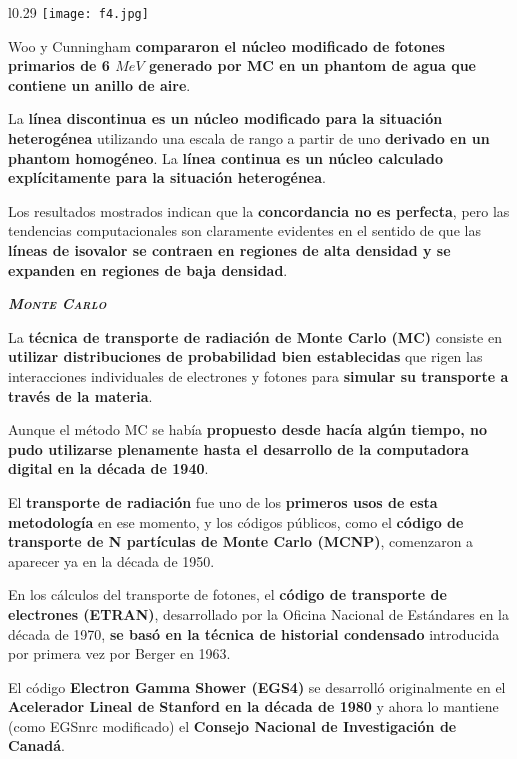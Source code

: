 \documentclass[aspectratio=169,xcolor=dvipsnames,t]{beamer}
\begin{document}
\begin{frame}

    \begin{wrapfigure}{l}{0.29\textwidth}
        \centering
        \texttt{[image: f4.jpg]}
    \end{wrapfigure}

    Woo y Cunningham \textbf{compararon el núcleo modificado de fotones primarios de 6 $MeV$ generado por MC en un phantom de agua que contiene un anillo de aire}. 
    
    La \textbf{línea discontinua es un núcleo modificado para la situación heterogénea} utilizando una escala de rango a partir de uno \textbf{derivado en un phantom homogéneo}. La \textbf{línea continua es un núcleo calculado explícitamente para la situación heterogénea}.

    Los resultados mostrados indican que la \textbf{concordancia no es perfecta}, pero las tendencias computacionales son claramente evidentes en el sentido de que las \textbf{líneas de isovalor se contraen en regiones de alta densidad y se expanden en regiones de baja densidad}.

\end{frame}



\begin{frame}[standout]
    \centering\LARGE
    \textbf{\itshape\scshape Monte Carlo}
\end{frame}

\begin{frame}

    La \textbf{técnica de transporte de radiación de Monte Carlo (MC)} consiste en \textbf{utilizar distribuciones de probabilidad bien establecidas} que rigen las interacciones individuales de electrones y fotones para \textbf{simular su transporte a través de la materia}.

    Aunque el método MC se había \textbf{propuesto desde hacía algún tiempo, no pudo utilizarse plenamente hasta el desarrollo de la computadora digital en la década de 1940}.

    El \textbf{transporte de radiación} fue uno de los \textbf{primeros usos de esta metodología} en ese momento, y los códigos públicos, como el \textbf{código de transporte de N partículas de Monte Carlo (MCNP)}, comenzaron a aparecer ya en la década de 1950.

    En los cálculos del transporte de fotones, el \textbf{código de transporte de electrones (ETRAN)}, desarrollado por la Oficina Nacional de Estándares en la década de 1970, \textbf{se basó en la técnica de historial condensado} introducida por primera vez por Berger en 1963.

    El código \textbf{Electron Gamma Shower (EGS4)} se desarrolló originalmente en el \textbf{Acelerador Lineal de Stanford en la década de 1980} y ahora lo mantiene (como EGSnrc modificado) el \textbf{Consejo Nacional de Investigación de Canadá}. 

\end{frame}
\end{document}
